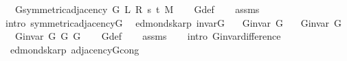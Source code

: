 \begin{isabellebody}
\ \ \ {\isachardoublequoteopen}G{\isachardot}{\kern0pt}symmetric{\isacharunderscore}{\kern0pt}adjacency{\isacharprime}{\kern0pt}\ {\isacharparenleft}{\kern0pt}G{}\ L\ R\ s\ t\ M{\isacharparenright}{\kern0pt}{\isachardoublequoteclose}%
\endisataginvisible
{\isafoldinvisible}%
%
\isadeliminvisible
\isanewline
%
\endisadeliminvisible
%
\isadelimproof
\ \ %
\endisadelimproof
%
\isatagproof
{}\isamarkupfalse%
\ G{}{\isacharunderscore}{\kern0pt}def\isanewline
\ \ \isamarkupfalse%
\ assms\isanewline
\ \ \isamarkupfalse%
\ {\isacharparenleft}{\kern0pt}intro\ symmetric{\isacharunderscore}{\kern0pt}adjacency{\isacharunderscore}{\kern0pt}G{}{\isacharunderscore}{\kern0pt}{}{\isacharparenright}{\kern0pt}%
\endisatagproof
{\isafoldproof}%
%
\isadelimproof
\isanewline
%
\endisadelimproof
%
\isadeliminvisible
\isanewline
%
\endisadeliminvisible
%
\isataginvisible
{}\isamarkupfalse%
\ {\isacharparenleft}{\kern0pt}\ edmonds{\isacharunderscore}{\kern0pt}karp{\isacharparenright}{\kern0pt}\ invar{\isacharunderscore}{\kern0pt}G{}{\isacharcolon}{\kern0pt}\isanewline
\ \ \ {\isachardoublequoteopen}G{\isachardot}{\kern0pt}invar\ G{\isachardoublequoteclose}\isanewline
\ \ \ {\isachardoublequoteopen}G{\isachardot}{\kern0pt}invar\ G{\isacharprime}{\kern0pt}{\isachardoublequoteclose}\isanewline
\ \ \ {\isachardoublequoteopen}G{\isachardot}{\kern0pt}invar\ {\isacharparenleft}{\kern0pt}G{}\ G\ G{\isacharprime}{\kern0pt}{\isacharparenright}{\kern0pt}{\isachardoublequoteclose}%
\endisataginvisible
{\isafoldinvisible}%
%
\isadeliminvisible
\isanewline
%
\endisadeliminvisible
%
\isadelimproof
\ \ %
\endisadelimproof
%
\isatagproof
{}\isamarkupfalse%
\ G{}{\isacharunderscore}{\kern0pt}def\isanewline
\ \ \isamarkupfalse%
\ assms\isanewline
\ \ \isamarkupfalse%
\ {\isacharparenleft}{\kern0pt}intro\ G{\isachardot}{\kern0pt}invar{\isacharunderscore}{\kern0pt}difference{\isacharparenright}{\kern0pt}%
\endisatagproof
{\isafoldproof}%
%
\isadelimproof
\isanewline
%
\endisadelimproof
%
\isadeliminvisible
\isanewline
%
\endisadeliminvisible
%
\isataginvisible
{}\isamarkupfalse%
\ {\isacharparenleft}{\kern0pt}\ edmonds{\isacharunderscore}{\kern0pt}karp{\isacharparenright}{\kern0pt}\ adjacency{\isacharunderscore}{\kern0pt}G{}{\isacharunderscore}{\kern0pt}cong{\isacharcolon}{\kern0pt}\isanewline

\end{isabellebody}
